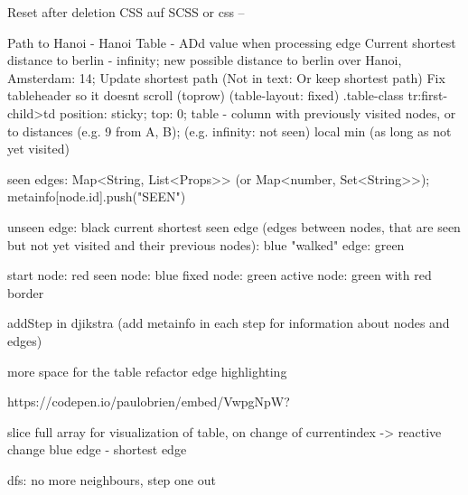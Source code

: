 \documentclass[options]{article}
\begin{document}
Reset after deletion
CSS auf SCSS or css --

Path to Hanoi - Hanoi
Table - ADd value when processing edge
Current shortest distance to berlin - infinity; new possible distance to berlin over Hanoi, Amsterdam: 14; Update shortest path (Not in text: Or keep shortest path)
Fix tableheader so it doesnt scroll (toprow) (table-layout: fixed)
.table-class tr:first-child>td{
    position: sticky;
    top: 0;
}
table - column with previously visited nodes, or to distances (e.g. 9 from A, B); (e.g. infinity: not seen)
local min (as long as not yet visited)

seen edges: Map<String, List<Props>> (or Map<number, Set<String>>); metainfo[node.id].push("SEEN")

unseen edge: black
current shortest seen edge (edges between nodes, that are seen but not yet visited and their previous nodes): blue
"walked" edge: green

start node: red
seen node: blue
fixed node: green
active node: green with red border

addStep in djikstra (add metainfo in each step for information about nodes and edges)

more space for the table
refactor edge highlighting

https://codepen.io/paulobrien/embed/VwpgNpW?



slice full array for visualization of table, on change of currentindex -> reactive change
blue edge - shortest edge

dfs:
no more neighbours, step one out
\end{document}
